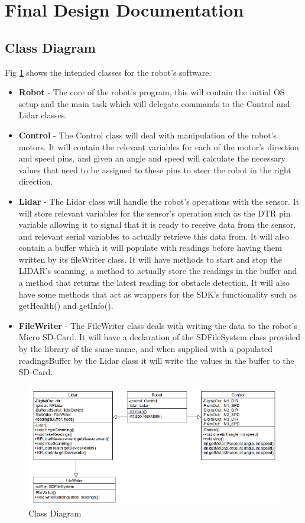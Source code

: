 		\section{Final Design Documentation}
		\label{sec:finaldesigndocs}
			\subsection{Class Diagram}
			Fig \ref{fig:classdiagram} shows the intended classes for the robot's software.
			\begin{itemize}
				\item \textbf{Robot} - The core of the robot's program, this will contain the initial OS setup and the main task which will delegate commands to the Control and Lidar classes.
				\item \textbf{Control} - The Control class will deal with manipulation of the robot's motors. It will contain the relevant variables for each of the motor's direction and speed pins, and given an angle and speed will calculate the necessary values that need to be assigned to these pins to steer the robot in the right direction. 
				\item \textbf{Lidar} - The Lidar class will handle the robot's operations with the sensor. It will store relevant variables for the sensor's operation such as the DTR pin variable allowing it to signal that it is ready to receive data from the sensor, and relevant serial variables to actually retrieve this data from. It will also contain a buffer which it will populate with readings before having them written by its fileWriter class. It will have methods to start and stop the LIDAR's scanning, a method to actually store the readings in the buffer and a method that returns the latest reading for obstacle detection. It will also have some methods that act as wrappers for the SDK's functionality such as getHealth() and getInfo().
				\item \textbf{FileWriter} - The FileWriter class deals with writing the data to the robot's Micro SD-Card. It will have a declaration of the SDFileSystem class provided by the library of the same name, and when supplied with a populated readingsBuffer by the Lidar class it will write the values in the buffer to the SD-Card.
			\end{itemize}
			\begin{figure}[ht]
				\centering
				\includegraphics[width=\linewidth]{SYNTHESIS/classdiagram.png}
				\caption{Class Diagram}
				\label{fig:classdiagram}
			\end{figure}
		
